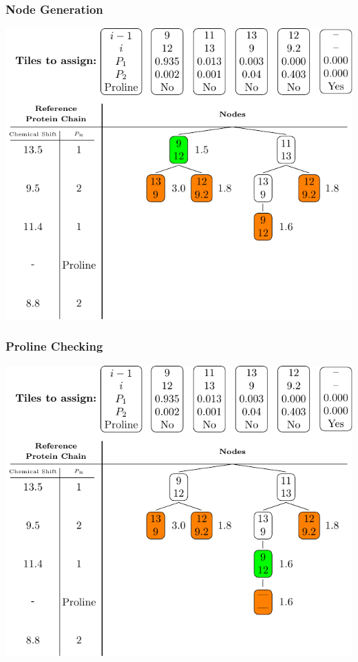 \documentclass{beamer}
\begin{document}
\begin{frame}
	\frametitle{Node Generation} 
	\vspace{-.5cm} 
	\center
	\includegraphics[width=.9\textwidth]{tilePlacement/step6}
\end{frame}

\begin{frame}
	\frametitle{Proline Checking}
	\vspace{-.5cm} 
	\center
	\includegraphics[width=.9\textwidth]{tilePlacement/step7}
\end{frame}
\end{document}
